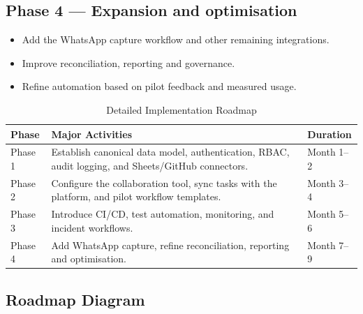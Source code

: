 \documentclass[12pt,a4paper]{report}
\begin{document}
\subsection*{Phase 4 --- Expansion and optimisation}
\begin{itemize}[leftmargin=2em]
    \item Add the WhatsApp capture workflow and other remaining integrations.
    \item Improve reconciliation, reporting and governance.
    \item Refine automation based on pilot feedback and measured usage.
\end{itemize}

\begin{table}[H]
\centering
\renewcommand{\arraystretch}{1.3}
\begin{tabularx}{\textwidth}{|p{3cm}|X|p{3cm}|}
\hline
\rowcolor{secondary}
\textbf{Phase} & \textbf{Major Activities} & \textbf{Duration} \\
\hline
Phase 1 & Establish canonical data model, authentication, RBAC, audit logging, and Sheets/GitHub connectors. & Month 1--2 \\
\hline
Phase 2 & Configure the collaboration tool, sync tasks with the platform, and pilot workflow templates. & Month 3--4 \\
\hline
Phase 3 & Introduce CI/CD, test automation, monitoring, and incident workflows. & Month 5--6 \\
\hline
Phase 4 & Add WhatsApp capture, refine reconciliation, reporting and optimisation. & Month 7--9 \\
\hline
\end{tabularx}
\caption{Detailed Implementation Roadmap}
\end{table}

\subsection{Roadmap Diagram}
\end{document}
